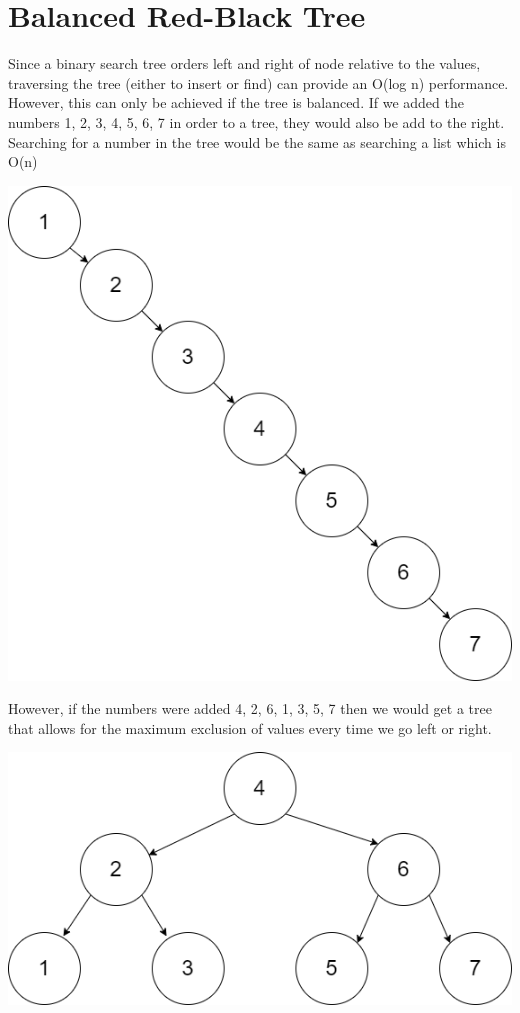 \documentclass[
]{book}
\begin{document}
\hypertarget{balanced-red-black-tree}{%
\section{Balanced Red-Black Tree}\label{balanced-red-black-tree}}

Since a binary search tree orders left and right of node relative to the values, traversing the tree (either to insert or find) can provide an O(log n) performance. However, this can only be achieved if the tree is balanced. If we added the numbers 1, 2, 3, 4, 5, 6, 7 in order to a tree, they would also be add to the right. Searching for a number in the tree would be the same as searching a list which is O(n)

\includegraphics{images/unbalanced_tree.drawio.png}

However, if the numbers were added 4, 2, 6, 1, 3, 5, 7 then we would get a tree that allows for the maximum exclusion of values every time we go left or right.

\includegraphics{images/balanced_tree.drawio.png}
\end{document}
